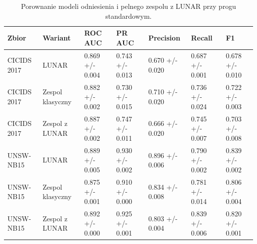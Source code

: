 \begin{table}
\caption{Porownanie modeli odniesienia i pelnego zespolu z LUNAR przy progu standardowym.}
\label{tab:ensemble_lunar_reference}
\begin{tabular}{lllllll}
\toprule
Zbior & Wariant & ROC AUC & PR AUC & Precision & Recall & F1 \\
\midrule
CICIDS 2017 & LUNAR & 0.869 +/- 0.004 & 0.743 +/- 0.013 & 0.670 +/- 0.020 & 0.687 +/- 0.001 & 0.678 +/- 0.010 \\
CICIDS 2017 & Zespol klasyczny & 0.882 +/- 0.002 & 0.730 +/- 0.015 & 0.710 +/- 0.020 & 0.736 +/- 0.024 & 0.722 +/- 0.003 \\
CICIDS 2017 & Zespol z LUNAR & 0.887 +/- 0.002 & 0.747 +/- 0.011 & 0.666 +/- 0.020 & 0.745 +/- 0.007 & 0.703 +/- 0.008 \\
UNSW-NB15 & LUNAR & 0.889 +/- 0.005 & 0.930 +/- 0.002 & 0.896 +/- 0.006 & 0.790 +/- 0.002 & 0.839 +/- 0.002 \\
UNSW-NB15 & Zespol klasyczny & 0.875 +/- 0.001 & 0.910 +/- 0.000 & 0.834 +/- 0.008 & 0.781 +/- 0.014 & 0.806 +/- 0.004 \\
UNSW-NB15 & Zespol z LUNAR & 0.892 +/- 0.000 & 0.925 +/- 0.001 & 0.803 +/- 0.004 & 0.839 +/- 0.006 & 0.820 +/- 0.001 \\
\bottomrule
\end{tabular}
\end{table}
